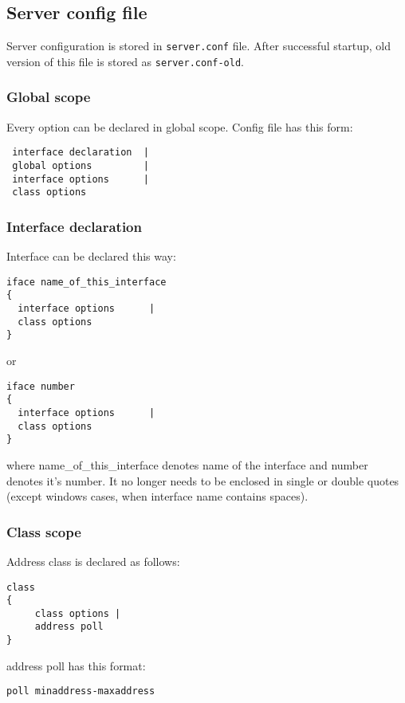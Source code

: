 \subsection{Server config file}

Server configuration is stored in \verb+server.conf+ file. After
successful startup, old version of this file is stored as \verb+server.conf-old+.

\subsubsection{Global scope}

Every option can be declared in global scope.
Config file has this form:

\begin{verbatim}
 interface declaration  |
 global options         |
 interface options      |
 class options          
\end{verbatim}

\subsubsection{Interface declaration}

Interface can be declared this way:
\begin{verbatim}
iface name_of_this_interface
{
  interface options      |
  class options        
}
\end{verbatim}

or 

\begin{verbatim}
iface number 
{
  interface options      |
  class options        
}
\end{verbatim}

where name\_of\_this\_interface denotes name of the interface and
number denotes it's number. It no longer needs to be enclosed in
single or double quotes (except windows cases, when interface name
contains spaces).

\subsubsection{Class scope}
Address class is declared as follows:

\begin{verbatim}
class
{  
     class options |
     address poll    
}
\end{verbatim}

address poll has this format:
\begin{verbatim}
poll minaddress-maxaddress
\end{verbatim}

